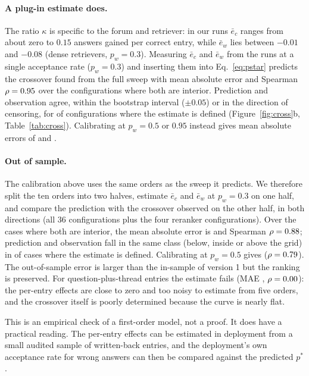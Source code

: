 \documentclass[11pt]{article}
\begin{document}
\paragraph{A plug-in estimate does.} The ratio $\kappa$ is specific to the forum and retriever: in our runs $\bar e_c$ ranges from about zero to $0.15$ answers gained per correct entry, while $\bar e_w$ lies between $-0.01$ and $-0.08$ (dense retrievers, $p_w=0.3$). Measuring $\bar e_c$ and $\bar e_w$ from the runs at a single acceptance rate ($p_w=0.3$) and inserting them into Eq.~\eqref{eq:pstar} predicts the crossover found from the full sweep with mean absolute error \plugMAE{} and Spearman $\rho=0.95$ over the \plugN{} configurations where both are interior. Prediction and observation agree, within the bootstrap interval ($\pm0.05$) or in the direction of censoring, for \plugAgree{} of \plugTot{} configurations where the estimate is defined (Figure~\ref{fig:cross}b, Table~\ref{tab:cross}). Calibrating at $p_w=0.5$ or $0.95$ instead gives mean absolute errors of \plugMAEfive{} and \plugMAEnn{}. \paragraph{Out of sample.} The calibration above uses the same orders as the sweep it predicts. We therefore split the ten orders into two halves, estimate $\bar e_c$ and $\bar e_w$ at $p_w=0.3$ on one half, and compare the prediction with the crossover observed on the other half, in both directions (all 36 configurations plus the four reranker configurations). Over the \oosNAskTh{} cases where both are interior, the mean absolute error is \oosMAEAskTh{} and Spearman $\rho=0.88$; prediction and observation fall in the same class (below, inside or above the grid) in \oosSameAskTh{} of \oosDefAskTh{} cases where the estimate is defined. Calibrating at $p_w=0.5$ gives \oosMAEAskFi{} ($\rho=0.79$). The out-of-sample error is larger than the in-sample \plugMAE{} of version 1 but the ranking is preserved. For question-plus-thread entries the estimate fails (MAE \oosMAEAskdocTh, $\rho=0.00$): the per-entry effects are close to zero and too noisy to estimate from five orders, and the crossover itself is poorly determined because the curve is nearly flat.

This is an empirical check of a first-order model, not a proof. It does have a practical reading. The per-entry effects can be estimated in deployment from a small audited sample of written-back entries, and the deployment's own acceptance rate for wrong answers can then be compared against the predicted $p^*$.
\end{document}
